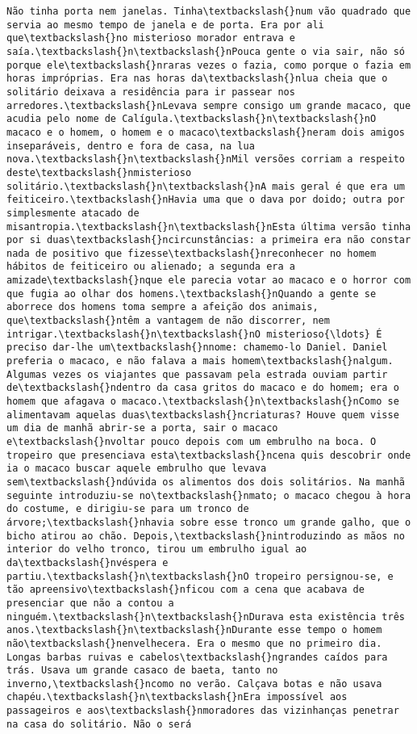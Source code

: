 \documentclass[11pt]{article}
\begin{document}
\begin{Verbatim}[commandchars=\\\{\}]
Não tinha porta nem janelas. Tinha\textbackslash{}num vão quadrado que servia ao mesmo tempo de janela e de porta. Era por ali que\textbackslash{}no misterioso morador entrava e saía.\textbackslash{}n\textbackslash{}nPouca gente o via sair, não só porque ele\textbackslash{}nraras vezes o fazia, como porque o fazia em horas impróprias. Era nas horas da\textbackslash{}nlua cheia que o solitário deixava a residência para ir passear nos arredores.\textbackslash{}nLevava sempre consigo um grande macaco, que acudia pelo nome de Calígula.\textbackslash{}n\textbackslash{}nO macaco e o homem, o homem e o macaco\textbackslash{}neram dois amigos inseparáveis, dentro e fora de casa, na lua nova.\textbackslash{}n\textbackslash{}nMil versões corriam a respeito deste\textbackslash{}nmisterioso solitário.\textbackslash{}n\textbackslash{}nA mais geral é que era um feiticeiro.\textbackslash{}nHavia uma que o dava por doido; outra por simplesmente atacado de misantropia.\textbackslash{}n\textbackslash{}nEsta última versão tinha por si duas\textbackslash{}ncircunstâncias: a primeira era não constar nada de positivo que fizesse\textbackslash{}nreconhecer no homem hábitos de feiticeiro ou alienado; a segunda era a amizade\textbackslash{}nque ele parecia votar ao macaco e o horror com que fugia ao olhar dos homens.\textbackslash{}nQuando a gente se aborrece dos homens toma sempre a afeição dos animais, que\textbackslash{}ntêm a vantagem de não discorrer, nem intrigar.\textbackslash{}n\textbackslash{}nO misterioso{\ldots} É preciso dar-lhe um\textbackslash{}nnome: chamemo-lo Daniel. Daniel preferia o macaco, e não falava a mais homem\textbackslash{}nalgum. Algumas vezes os viajantes que passavam pela estrada ouviam partir de\textbackslash{}ndentro da casa gritos do macaco e do homem; era o homem que afagava o macaco.\textbackslash{}n\textbackslash{}nComo se alimentavam aquelas duas\textbackslash{}ncriaturas? Houve quem visse um dia de manhã abrir-se a porta, sair o macaco e\textbackslash{}nvoltar pouco depois com um embrulho na boca. O tropeiro que presenciava esta\textbackslash{}ncena quis descobrir onde ia o macaco buscar aquele embrulho que levava sem\textbackslash{}ndúvida os alimentos dos dois solitários. Na manhã seguinte introduziu-se no\textbackslash{}nmato; o macaco chegou à hora do costume, e dirigiu-se para um tronco de árvore;\textbackslash{}nhavia sobre esse tronco um grande galho, que o bicho atirou ao chão. Depois,\textbackslash{}nintroduzindo as mãos no interior do velho tronco, tirou um embrulho igual ao da\textbackslash{}nvéspera e partiu.\textbackslash{}n\textbackslash{}nO tropeiro persignou-se, e tão apreensivo\textbackslash{}nficou com a cena que acabava de presenciar que não a contou a ninguém.\textbackslash{}n\textbackslash{}nDurava esta existência três anos.\textbackslash{}n\textbackslash{}nDurante esse tempo o homem não\textbackslash{}nenvelhecera. Era o mesmo que no primeiro dia. Longas barbas ruivas e cabelos\textbackslash{}ngrandes caídos para trás. Usava um grande casaco de baeta, tanto no inverno,\textbackslash{}ncomo no verão. Calçava botas e não usava chapéu.\textbackslash{}n\textbackslash{}nEra impossível aos passageiros e aos\textbackslash{}nmoradores das vizinhanças penetrar na casa do solitário. Não o será 
\end{Verbatim}
\end{document}
